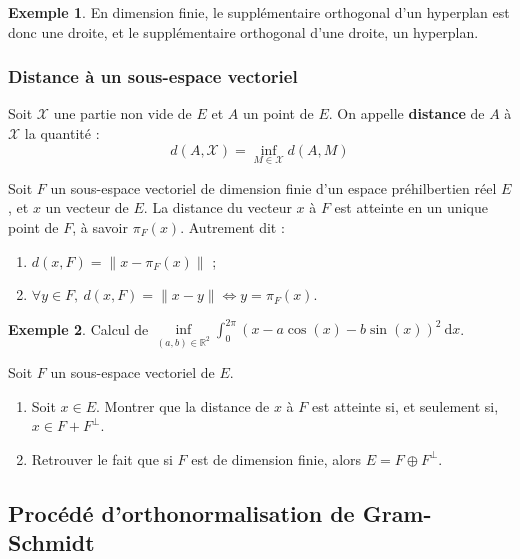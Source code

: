 \documentclass[french]{article}
\newcommand{\R}{\mathbb{R}}
\renewcommand{\d}{\text{d}}
\theoremstyle{plain}
\theoremstyle{definition}
\newtheorem*{ex}{Exemple}
\theoremstyle{remark}
\begin{document}
\begin{ex}
	En dimension finie, le supplémentaire orthogonal d'un hyperplan est donc une droite, et le supplémentaire orthogonal d'une droite, un hyperplan.
\end{ex}

\subsubsection*{Distance à un sous-espace vectoriel}

\begin{dfn}
	Soit $\mathcal{X}$ une partie non vide de $E$ et $A$ un point de $E$. On appelle \textbf{distance} de $A$ à $\mathcal{X}$ la quantité : $$d(A,\mathcal{X})=\underset{M\in\mathcal{X}}{\inf}d(A,M)$$
\end{dfn}

\begin{thm}
	Soit $F$ un sous-espace vectoriel de dimension finie d'un espace préhilbertien réel $E$, et $x$ un vecteur de $E$. La distance du vecteur $x$ à $F$ est atteinte en un unique point de $F$, à savoir $\pi_F(x)$. Autrement dit : 
	\begin{enumerate}
		\item $d(x,F)=\lVert x-\pi_F(x)\rVert$ ;
		\item $\forall y\in F,\ d(x,F)=\lVert x-y\rVert\iff y=\pi_F(x)$.
	\end{enumerate}
\end{thm}

\begin{ex}
	Calcul de $\displaystyle\underset{(a,b)\in\R^2}{\inf}\int_{0}^{2\pi}(x-a\cos(x)-b\sin(x))^2\ \d x$.
\end{ex}

\begin{exo}
	Soit $F$ un sous-espace vectoriel de $E$.
	\begin{enumerate}
		\item Soit $x\in E$. Montrer que la distance de $x$ à $F$ est atteinte si, et seulement si, $x\in F+F^\bot$.
		\item Retrouver le fait que si $F$ est de dimension finie, alors $E=F\oplus F^\bot$.
	\end{enumerate}
\end{exo}

\subsection{Procédé d'orthonormalisation de Gram-Schmidt}
\end{document}

